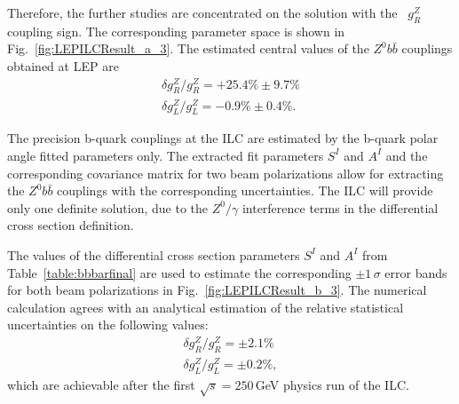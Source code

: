 Therefore, the further studies are concentrated on the solution with the \sm\ $g_R^Z$ coupling sign. 
The corresponding parameter space is shown in Fig.~\ref{fig:LEPILCResult_a_3}.
The estimated  central values of the $Z^0b\bar{b}$ couplings obtained at LEP are
\begin{eqnarray}
	\delta g_R^Z / g_R^Z = +25.4\% \pm 9.7\% \label{formula:LEPgR} \\
	\delta  g_L^Z / g_L^Z = -0.9\% \pm 0.4\%.
\end{eqnarray}



The precision b-quark couplings at the ILC are estimated by the b-quark polar angle fitted parameters only.
The extracted fit parameters $S^I$ and $A^I$ and the corresponding covariance matrix for two beam polarizations allow for extracting the $Z^0b\bar{b}$ couplings with the corresponding uncertainties. 
The ILC will provide only one definite solution, due to the $Z^0/\gamma$ interference terms in the differential cross section definition. 

The values of the differential cross section parameters $S^I$ and $A^I$ from Table~\ref{table:bbbarfinal} are used to estimate the corresponding $\pm1\,\sigma$ error bands for both beam polarizations in Fig.~\ref{fig:LEPILCResult_b_3}.
The numerical calculation agrees with an analytical estimation of the relative statistical uncertainties on the following values:
\begin{eqnarray}
	\delta g_R^Z / g_R^Z = \pm 2.1\% \label{formula:ILCgR} \\
	\delta  g_L^Z / g_L^Z = \pm 0.2\%,
\end{eqnarray}
which are achievable after the first $\sqrt{s} = 250$\,GeV physics run of the ILC. 


